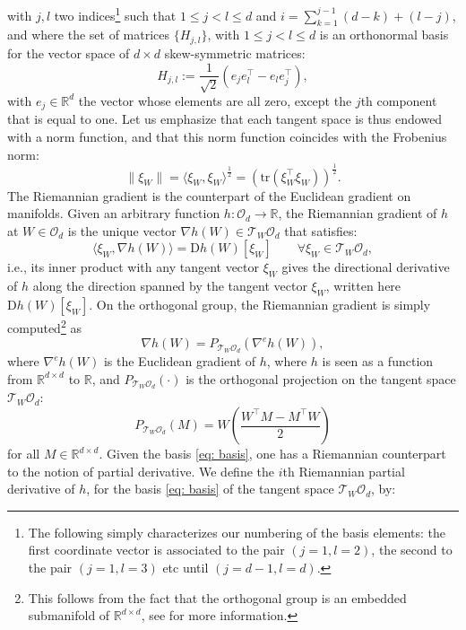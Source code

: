 \documentclass{article}
\def \grad {\nabla}
\def \R {\mathbb{R}}
\def \O {\mathcal{O}}
\def \T {\mathcal{T}}
\def \D {\mathrm{D}}
\newcommand{\tr}[1]{\mathrm{tr}\left(#1 \right)}
\begin{document}
with $j,l$ two indices\footnote{The following simply characterizes our numbering of the basis elements: the first coordinate vector is associated to the pair $(j = 1, l = 2)$, the second to the pair $(j = 1, l = 3)$ etc until $(j = d-1, l = d)$.} such that $1 \leq j < l \leq d$ and $i = \sum_{k = 1}^{j-1}(d-k) + (l-j)$, and where the set of matrices $\{H_{j,l}\}$, with $1 \leq j < l \leq d$ is an orthonormal basis for the vector space of $d \times d$ skew-symmetric matrices: 
\begin{equation} \label{eq: H}
    H_{j,l}  := \frac{1}{\sqrt{2}} \left( e_je_l^\top  - e_l e_j^\top \right),
\end{equation}
with $e_j \in \mathbb{R}^d$ the vector whose elements are all zero, except the $j$th component that is equal to one. Let us emphasize that each tangent space is thus endowed with a norm function, and that this norm function coincides with the Frobenius norm:
\begin{equation} \label{eq:norm}
    \| \xi_{W} \| =  \langle \xi_{W}, \xi_{W} \rangle^{\frac{1}{2}} = (\tr{\xi_W^\top \xi_W})^{\frac{1}{2}}.
\end{equation}
 The Riemannian gradient is the counterpart of the Euclidean gradient on manifolds. Given an arbitrary function $h : \mathcal{O}_d \to \mathbb{R}$, the Riemannian gradient of $h$ at $W \in \mathcal{O}_d$ is the unique vector $\grad h(W) \in \mathcal{T}_W \mathcal{O}_d$ that satisfies:
\[ \langle \xi_W, \grad h(W)\rangle  = \D h(W)[\xi_W] \qquad \forall \xi_W \in \T_{W} \O_d, \]
i.e., its inner product with any tangent vector $\xi_W$ gives the directional derivative of $h$ along the direction spanned by the tangent vector $\xi_W$, written here $\D h(W)[\xi_W]$. On the orthogonal group, the Riemannian gradient is simply computed\footnote{This follows from the fact that the orthogonal group is an embedded submanifold of $\R^{d \times d}$, see \cite[Chap. 3]{AMS2008} for more information.} as
\[ \grad h(W) = P_{\T_W \O_d} (\nabla^e h(W)), \]
where $\nabla^e  h(W)$ is the Euclidean gradient of $h$, where $h$ is seen as a function from $\R^{d \times d}$ to $\R$, and $P_{\T_W \O_d}(\cdot)$ is the orthogonal projection on the tangent space $\T_W \O_d$:
\begin{equation}
    P_{\T_W \O_d}(M) = W \left(\frac{W^\top M - M^\top W}{2}\right)
\end{equation}
for all $M \in \R^{d \times d}$. Given the basis \eqref{eq: basis}, one has a Riemannian counterpart to the notion of partial derivative. We define the $i$th Riemannian partial derivative of $h$, for the basis \eqref{eq: basis} of the tangent space $\mathcal{T}_W \O_d$, by:
\end{document}
